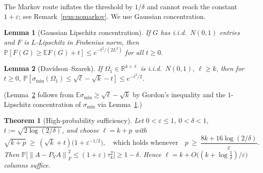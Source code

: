 \documentclass{amsart}
\newtheorem{theorem}{Theorem}
\newtheorem{lemma}{Lemma}
\theoremstyle{definition}
\newcommand{\R}{\mathbb{R}}
\newcommand{\Frob}[1]{\left\lVert #1\right\rVert_F}
\newcommand{\E}{\mathbb{E}}
\newcommand{\Prob}{\mathbb{P}}
\begin{document}
The Markov route inflates the threshold by $1/\delta$ and cannot reach the
constant $1+\varepsilon$; see Remark~\ref{rem:nomarkov}. We use Gaussian
concentration.

\begin{lemma}[Gaussian Lipschitz concentration]\label{lem:lip}
If $G$ has i.i.d.\ $N(0,1)$ entries and $F$ is $L$-Lipschitz in Frobenius norm,
then $\Prob[F(G)\ge\E F(G)+t]\le e^{-t^2/(2L^2)}$ for all $t\ge0$.
\end{lemma}

\begin{lemma}[Davidson--Szarek]\label{lem:smin}
If $\Omega_1\in\R^{k\times\ell}$ is i.i.d.\ $N(0,1)$, $\ell\ge k$, then for
$t\ge0$, $\Prob[\sigma_{\min}(\Omega_1)\le\sqrt\ell-\sqrt k-t]\le e^{-t^2/2}$.
\end{lemma}

(Lemma~\ref{lem:smin} follows from $\E\sigma_{\min}\ge\sqrt\ell-\sqrt k$ by
Gordon's inequality and the $1$-Lipschitz concentration of
$\sigma_{\min}$ via Lemma~\ref{lem:lip}.)

\begin{theorem}[High-probability sufficiency]\label{thm:hp}
Let $0<\varepsilon\le1$, $0<\delta<1$, $t:=\sqrt{2\log(2/\delta)}$, and choose
$\ell=k+p$ with
\begin{equation}\label{eq:hpthresh}
\sqrt{k+p}\ \ge\ (\sqrt k+t)\big(1+\varepsilon^{-1/2}\big),
\quad\text{which holds whenever}\quad
p\ \ge\ \frac{8k+16\log(2/\delta)}{\varepsilon}.
\end{equation}
Then $\Prob\big[\Frob{A-P_YA}^2\le(1+\varepsilon)\tau_k^2\big]\ge1-\delta$.
Hence $\ell=k+O\big((k+\log\tfrac1\delta)/\varepsilon\big)$ columns suffice.
\end{theorem}
\end{document}
